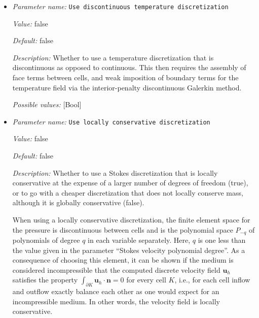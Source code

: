 \begin{itemize}
{\it Value:} false


{\it Default:} false


{\it Description:} Whether to use a composition discretization that is discontinuous as opposed to continuous. This then requires the assembly of face terms between cells, and weak imposition of boundary terms for the composition field via the discontinuous Galerkin method.


{\it Possible values:} [Bool]
\item {\it Parameter name:} {\tt Use discontinuous temperature discretization}
\label{parameters:Discretization/Use discontinuous temperature discretization}


{\it Value:} false


{\it Default:} false


{\it Description:} Whether to use a temperature discretization that is discontinuous as opposed to continuous. This then requires the assembly of face terms between cells, and weak imposition of boundary terms for the temperature field via the interior-penalty discontinuous Galerkin method.


{\it Possible values:} [Bool]
\item {\it Parameter name:} {\tt Use locally conservative discretization}
\label{parameters:Discretization/Use locally conservative discretization}


{\it Value:} false


{\it Default:} false


{\it Description:} Whether to use a Stokes discretization that is locally conservative at the expense of a larger number of degrees of freedom (true), or to go with a cheaper discretization that does not locally conserve mass, although it is globally conservative (false).

When using a locally conservative discretization, the finite element space for the pressure is discontinuous between cells and is the polynomial space $P_ {-q}$ of polynomials of degree $q$ in each variable separately. Here, $q$ is one less than the value given in the parameter ``Stokes velocity polynomial degree''. As a consequence of choosing this element, it can be shown if the medium is considered incompressible that the computed discrete velocity field $\mathbf u_h$ satisfies the property $\int_ {\partial K} \mathbf u_h \cdot \mathbf n = 0$ for every cell $K$, i.e., for each cell inflow and outflow exactly balance each other as one would expect for an incompressible medium. In other words, the velocity field is locally conservative.


\end{itemize}
